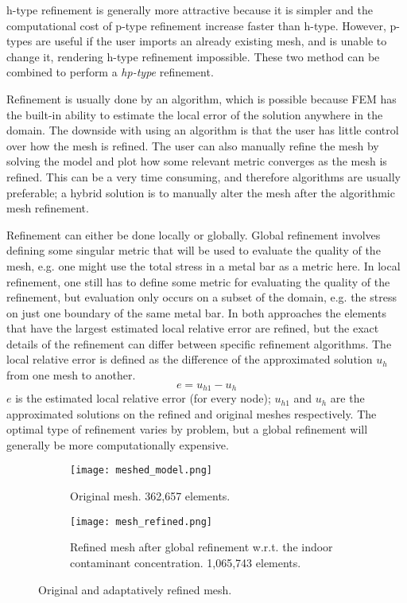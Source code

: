 h-type refinement is generally more attractive because it is simpler and the computational cost of p-type refinement increase faster than h-type.
However, p-types are useful if the user imports an already existing mesh, and is unable to change it, rendering h-type refinement impossible.
These two method can be combined to perform a \textit{hp-type} refinement.\par

Refinement is usually done by an algorithm, which is possible because FEM has the built-in ability to estimate the local error of the solution anywhere in the domain.
The downside with using an algorithm is that the user has little control over how the mesh is refined.
The user can also manually refine the mesh by solving the model and plot how some relevant metric converges as the mesh is refined.
This can be a very time consuming, and therefore algorithms are usually preferable; a hybrid solution is to manually alter the mesh after the algorithmic mesh refinement.\par

Refinement can either be done locally or globally.
Global refinement involves defining some singular metric that will be used to evaluate the quality of the mesh, e.g. one might use the total stress in a metal bar as a metric here.
In local refinement, one still has to define some metric for evaluating the quality of the refinement, but evaluation only occurs on a subset of the domain, e.g. the stress on just one boundary of the same metal bar.
In both approaches the elements that have the largest estimated local relative error are refined, but the exact details of the refinement can differ between specific refinement algorithms.
The local relative error is defined as the difference of the approximated solution $u_h$ from one mesh to another.
\begin{equation}\label{eq:rel_error}
  e = u_{h1} - u_h
\end{equation}
$e$ is the estimated local relative error (for every node);
$u_{h1}$ and $u_h$ are the approximated solutions on the refined and original meshes respectively.
The optimal type of refinement varies by problem, but a global refinement will generally be more computationally expensive.\par

\begin{figure}[htb!]
  \centering
  \begin{subfigure}[b]{\textwidth}
    \texttt{[image: meshed\_model.png]}
    \caption{Original mesh. 362,657 elements.}
    \label{fig:mesh_before_refinement}
  \end{subfigure}
  \begin{subfigure}[b]{\textwidth}
    \texttt{[image: mesh\_refined.png]}
    \caption{Refined mesh after global refinement w.r.t. the indoor contaminant concentration. 1,065,743 elements.}
    \label{fig:mesh_after_refinement}
  \end{subfigure}
    \caption[Original and adaptatively refined mesh.]{Original and adaptatively refined mesh.}
    \label{fig:mesh_refinement_mesh}
\end{figure}


